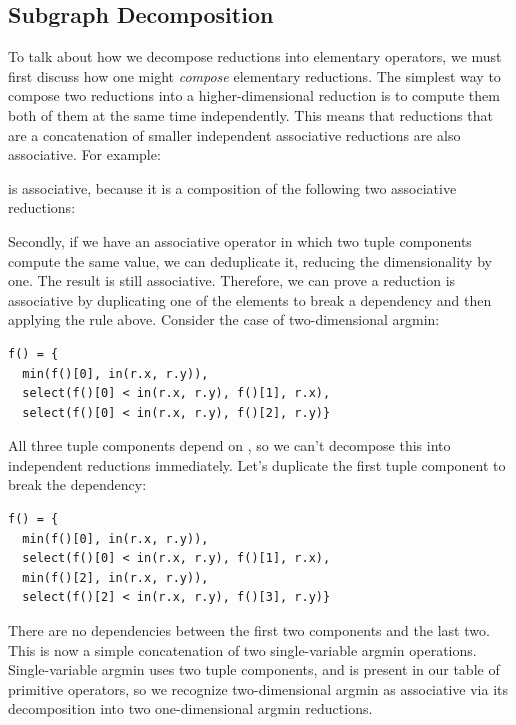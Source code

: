 \subsection{Subgraph Decomposition}
\label{subsec:decomposition}

To talk about how we decompose reductions into elementary operators, we must first discuss how one might \emph{compose} elementary reductions. The simplest way to compose two reductions into a higher-dimensional reduction is to compute them both of them at the same time independently. This means that reductions that are a concatenation of smaller independent associative reductions are also associative. For example:


is associative, because it is a composition of the following two associative reductions:



Secondly, if we have an associative operator in which two tuple components compute the same value, we can deduplicate it, reducing the dimensionality by one. The result is still associative. Therefore, we can prove a reduction is associative by duplicating one of the elements to break a dependency and then applying the rule above. Consider the case of two-dimensional argmin:

\begin{lstlisting}[caption={Two-dimensional argmin. The three tuple components are the minimum value, and its $x$ and $y$ coordinates.}]
f() = {
  min(f()[0], in(r.x, r.y)),
  select(f()[0] < in(r.x, r.y), f()[1], r.x),
  select(f()[0] < in(r.x, r.y), f()[2], r.y)}
\end{lstlisting}

All three tuple components depend on , so we can't decompose this into independent reductions immediately. Let's duplicate the first tuple component to break the dependency:

\begin{lstlisting}[caption={Two-dimensional argmin with the minimum value redundantly computed as \code{f()[0]} and \code{f()[2]}}]
f() = {
  min(f()[0], in(r.x, r.y)),
  select(f()[0] < in(r.x, r.y), f()[1], r.x),
  min(f()[2], in(r.x, r.y)),
  select(f()[2] < in(r.x, r.y), f()[3], r.y)}
\end{lstlisting}

There are no dependencies between the first two components and the last two. This is now a simple concatenation of two single-variable argmin operations. Single-variable argmin uses two tuple components, and is present in our table of primitive operators, so we recognize two-dimensional argmin as associative via its decomposition into two one-dimensional argmin reductions.

